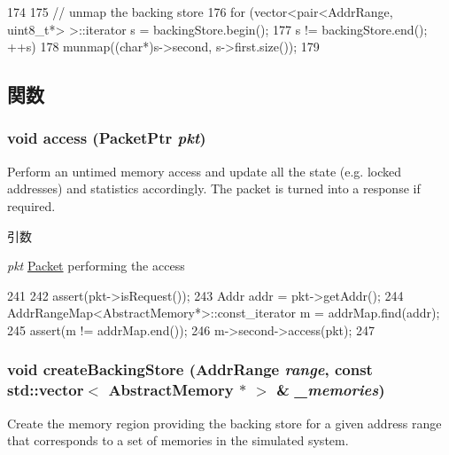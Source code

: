 \begin{DoxyCode}
174 {
175     // unmap the backing store
176     for (vector<pair<AddrRange, uint8_t*> >::iterator s = backingStore.begin();
177          s != backingStore.end(); ++s)
178         munmap((char*)s->second, s->first.size());
179 }
\end{DoxyCode}


\subsection{関数}
\hypertarget{classPhysicalMemory_aac5d96736802cb79fb2287135bcc1dff}{
\subsubsection[{access}]{\setlength{\rightskip}{0pt plus 5cm}void access ({\bf PacketPtr} {\em pkt})}}
\label{classPhysicalMemory_aac5d96736802cb79fb2287135bcc1dff}
Perform an untimed memory access and update all the state (e.g. locked addresses) and statistics accordingly. The packet is turned into a response if required.


\begin{DoxyParams}{引数}
\item[{\em pkt}]\hyperlink{classPacket}{Packet} performing the access \end{DoxyParams}



\begin{DoxyCode}
241 {
242     assert(pkt->isRequest());
243     Addr addr = pkt->getAddr();
244     AddrRangeMap<AbstractMemory*>::const_iterator m = addrMap.find(addr);
245     assert(m != addrMap.end());
246     m->second->access(pkt);
247 }
\end{DoxyCode}
\hypertarget{classPhysicalMemory_a4a205bfc337649ce4e62fe5cb5c7579a}{
\subsubsection[{createBackingStore}]{\setlength{\rightskip}{0pt plus 5cm}void createBackingStore ({\bf AddrRange} {\em range}, \/  const {\bf std::vector}$<$ {\bf AbstractMemory} $\ast$ $>$ \& {\em \_\-memories})}}
\label{classPhysicalMemory_a4a205bfc337649ce4e62fe5cb5c7579a}
Create the memory region providing the backing store for a given address range that corresponds to a set of memories in the simulated system.


